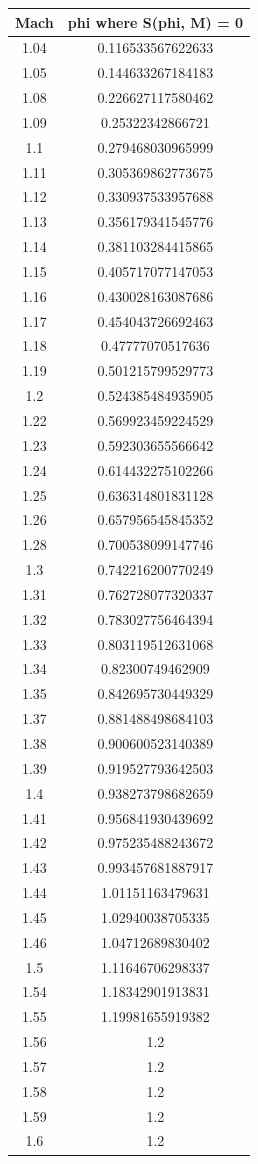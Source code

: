 \documentclass{report}
\begin{document}
\begin{tabular}{c | c}
Mach & phi where S(phi, M) = 0 \\
\hline
1.04 &  0.116533567622633\\
1.05 &  0.144633267184183\\
1.08 &  0.226627117580462\\
1.09 &  0.25322342866721\\
1.1  & 0.279468030965999\\
1.11 &  0.305369862773675\\
1.12 &  0.330937533957688\\
1.13 &  0.356179341545776\\
1.14 &  0.381103284415865\\
1.15 &  0.405717077147053\\
1.16 &  0.430028163087686\\
1.17 &  0.454043726692463\\
1.18 &  0.47777070517636\\
1.19 &  0.501215799529773\\
1.2  & 0.524385484935905\\
1.22 &  0.569923459224529\\
1.23 &  0.592303655566642\\
1.24 &  0.614432275102266\\
1.25 &  0.636314801831128\\
1.26 &  0.657956545845352\\
1.28 &  0.700538099147746\\
1.3  & 0.742216200770249\\
1.31 &  0.762728077320337\\
1.32 &  0.783027756464394\\
1.33 &  0.803119512631068\\
1.34 &  0.82300749462909\\
1.35 &  0.842695730449329\\
1.37 &  0.881488498684103\\
1.38 &  0.900600523140389\\
1.39 &  0.919527793642503\\
1.4  & 0.938273798682659\\
1.41 &  0.956841930439692\\
1.42 &  0.975235488243672\\
1.43 &  0.993457681887917\\
1.44 &  1.01151163479631\\
1.45 &  1.02940038705335\\
1.46 &  1.04712689830402\\
1.5  & 1.11646706298337\\
1.54 &  1.18342901913831\\
1.55 &  1.19981655919382\\
1.56 &  1.2\\
1.57 &  1.2\\
1.58 &  1.2\\
1.59 &  1.2\\
1.6  & 1.2\\
\hline
\end{tabular}
\end{document}
